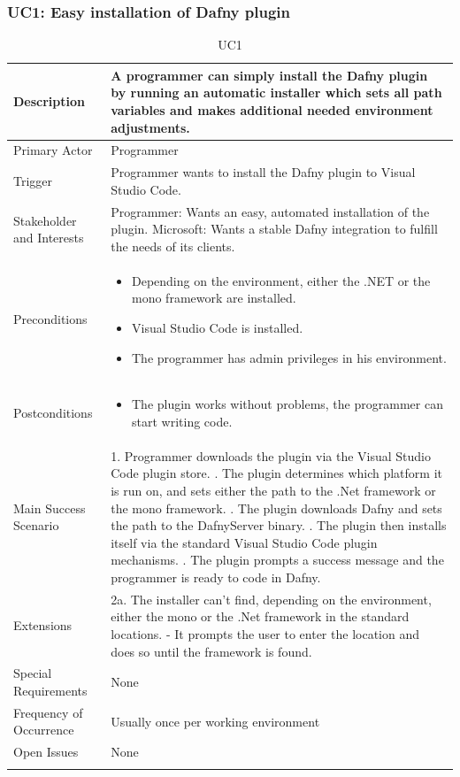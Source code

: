 \subsubsection{UC1: Easy installation of Dafny plugin}
\begin{longtable}{l | p{} }
	Description & A programmer can simply install the Dafny plugin by running an automatic installer which sets all path variables and makes additional needed environment adjustments.\\ \hline
	Primary Actor & Programmer\\ \hline
	Trigger & Programmer wants to install the Dafny plugin to Visual Studio Code.\\ \hline
	Stakeholder and Interests & Programmer: Wants an easy, automated installation of the plugin. \newline Microsoft: Wants a stable Dafny integration to fulfill the needs of its clients.\\ \hline
	Preconditions &\begin{itemize}
		\item Depending on the environment, either the .NET or the mono framework are installed.
		\item Visual Studio Code is installed.
		\item The programmer has admin privileges in his environment.
	\end{itemize}\\ \hline
	Postconditions & 
	\begin{itemize}
		\item The plugin works without problems, the programmer can start writing code.
	\end{itemize} \\ \hline
	Main Success Scenario & 
	1. Programmer downloads the plugin via the Visual Studio Code plugin store. \newline
	2. The plugin determines which platform it is run on, and sets either the path to the .Net framework or the mono framework. \newline
	3. The plugin downloads Dafny and sets the path to the DafnyServer binary. \newline
	4. The plugin then installs itself via the standard Visual Studio Code plugin mechanisms. \newline
	5. The plugin prompts a success message and the programmer is ready to code in Dafny.\\ \hline
	Extensions & 
	2a. The installer can't find, depending on the environment, either the mono or the .Net framework in the standard locations. \newline 
	- It prompts the user to enter the location and does so until the framework is found. \\ \hline
	Special Requirements & None\\ \hline
	Frequency of Occurrence & Usually once per working environment\\ \hline
	Open Issues & None \\ \hline
	\caption{UC1}
\end{longtable}

